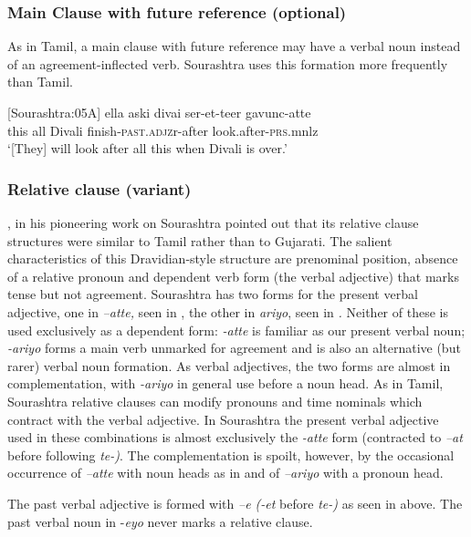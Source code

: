 \subsubsection{Main Clause with future reference (optional) }%

As in Tamil, a main clause with future reference may have a verbal noun instead of an agreement-inflected verb. Sourashtra uses this formation more frequently than Tamil.

\ea\label{smith:ex:41}
{}[Sourashtra:05A]
\gll ella aski diva{\textrtaill}i ser-et-teer gavunc-atte\\
this all Divali finish-\textsc{past}.\textsc{adjz}r-after look.after-\textsc{prs}.mnlz\\
`[They] will look after all this when Divali is over.'
\z


\subsubsection{Relative clause (variant)}%

\citet{Pandit1972}, in his pioneering work on Sourashtra pointed out that its relative clause structures were similar to Tamil rather than to Gujarati. The salient characteristics of this Dravidian-style structure are prenominal position, absence of a relative pronoun and dependent verb form (the verbal adjective) that marks tense but not agreement. Sourashtra has two forms for the present verbal adjective, one in \textit{{}--atte, }seen in , the other in \textit{\-ariyo}, seen in \textit{. }Neither of these is used exclusively as a dependent form: \-\textit{{}-atte }is familiar as our present verbal noun; \-\textit{{}-ariyo} forms a main verb unmarked for agreement and is also an alternative (but rarer) verbal noun formation. As verbal adjectives, the two forms are almost in complementation, with \textit{{}-ariyo} in general use before a noun head. As in Tamil, Sourashtra relative clauses can modify pronouns and time nominals which contract with the verbal adjective. In Sourashtra the present verbal adjective used in these combinations is almost exclusively the\textit{ -atte }form (contracted to \textit{{}--at} before following \textit{te-)}. The complementation is spoilt, however, by the occasional occurrence of \-\textit{{}--atte} with noun heads as in  and of \-\textit{{}--ariyo} with a pronoun head. 

The past verbal adjective is formed with \-\textit{{}--e (-et }before \textit{te-)} as seen in  above. The past verbal noun in \--\textit{eyo} never marks a relative clause.

